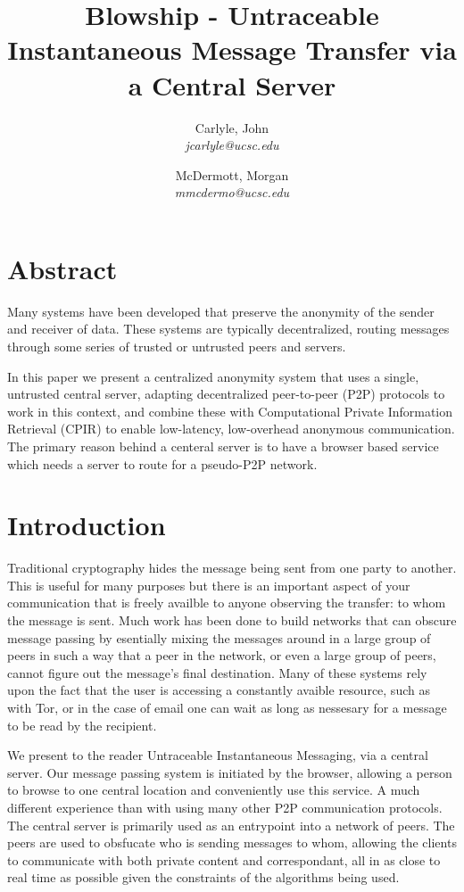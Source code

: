 \documentclass[twocolumn,11pt,english]{article}
\title{Blowship - Untraceable Instantaneous Message Transfer via a Central Server}
\date{}
\author{
  Carlyle, John\\
  \textit{jcarlyle@ucsc.edu}
  \and
  McDermott, Morgan\\
  \textit{mmcdermo@ucsc.edu}
}
\begin{document}
\maketitle

\section*{Abstract} 
Many systems have been developed that preserve the anonymity of the sender and receiver of data. These systems are typically decentralized, routing messages through some series of trusted or untrusted peers and servers. 

In this paper we present a centralized anonymity system that uses a single, untrusted central server, adapting decentralized peer-to-peer (P2P) protocols to work in this context, and combine these with Computational Private Information Retrieval (CPIR) to enable low-latency, low-overhead anonymous communication. The primary reason behind a centeral server is to have a browser based service which needs a server to route for a pseudo-P2P network.

\section{Introduction}

Traditional cryptography hides the message being sent from one party to another. This is useful for many purposes but there is an important aspect of your communication that is freely availble to anyone observing the transfer: to whom the message is sent. Much work has been done to build networks that can obscure message passing by esentially mixing the messages around in a large group of peers in such a way that a peer in the network, or even a large group of peers, cannot figure out the message's final destination. Many of these systems rely upon the fact that the user is accessing a constantly avaible resource, such as with Tor\cite{tor-design}, or in the case of email one can wait as long as nessesary for a message to be read by the recipient.

We present to the reader Untraceable Instantaneous Messaging, via a central server. Our message passing system is initiated by the browser, allowing a person to browse to one central location and conveniently use this service. A much different experience than with using many other P2P communication protocols. The central server is primarily used as an entrypoint into a network of peers. The peers are used to obsfucate who is sending messages to whom, allowing the clients to communicate with both private content and correspondant, all in as close to real time as possible given the constraints of the algorithms being used.
\end{document}
